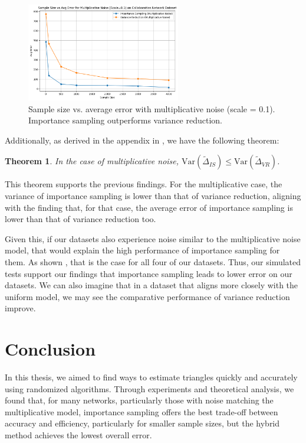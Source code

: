 \documentclass[11pt, margin=1in]{article}
\newtheorem{theorem}{Theorem}
\begin{document}
\begin{figure}[H]
    \centering
    \includegraphics[width=0.6\textwidth]{plots/simulated/percent_error_vs_sample_size_comparison_multiplicative_0.1.png}
    \caption{Sample size vs. average error with multiplicative noise (scale = 0.1). Importance sampling outperforms variance reduction.}
    \label{fig:multiplicative_noise_01}
\end{figure}

Additionally, as derived in the appendix in , we have the following theorem:

\begin{theorem}
\label{theorem:variance-comparison}
In the case of multiplicative noise, $\mathrm{Var}(\tilde{\Delta}_{IS}) \leq \mathrm{Var}(\tilde{\Delta}_{VR})$.
\end{theorem}

This theorem supports the previous findings.
For the multiplicative case, the variance of importance sampling is lower than that of variance reduction, aligning with the finding that, for that case, the average error of importance sampling is lower than that of variance reduction too.

Given this, if our datasets also experience noise similar to the multiplicative noise model, that would explain the high performance of importance sampling for them.
As shown , that is the case for all four of our datasets. 
Thus, our simulated tests support our findings that importance sampling leads to lower error on our datasets.
We can also imagine that in a dataset that aligns more closely with the uniform model, we may see the comparative performance of variance reduction improve.

\newpage

\section{Conclusion}

In this thesis, we aimed to find ways to estimate triangles quickly and accurately using randomized algorithms.
Through experiments and theoretical analysis, we found that, for many networks, particularly those with noise matching the multiplicative model, importance sampling offers the best trade-off between accuracy and efficiency, particularly for smaller sample sizes, but the hybrid method achieves the lowest overall error.
\end{document}

